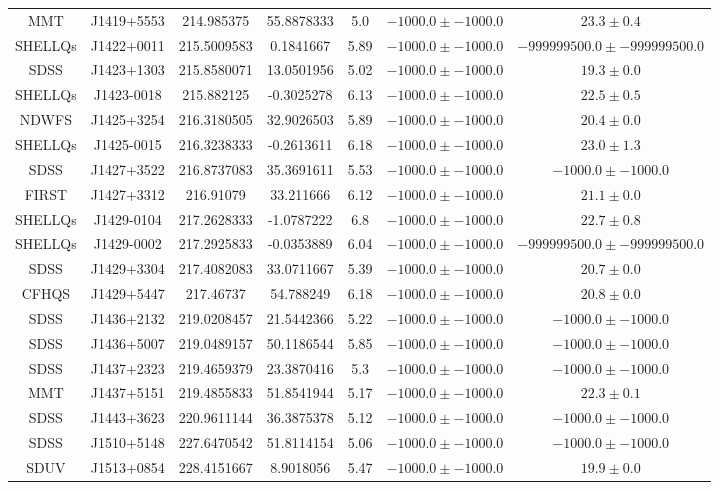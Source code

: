 \begin{table}
\begin{tabular}{ccccccc}
MMT & J1419+5553 & 214.985375 & 55.8878333 & 5.0 & $-1000.0\pm-1000.0$ & $  23.3\pm  0.4$ \\
SHELLQs & J1422+0011 & 215.5009583 & 0.1841667 & 5.89 & $-1000.0\pm-1000.0$ & $-999999500.0\pm-999999500.0$ \\
SDSS & J1423+1303 & 215.8580071 & 13.0501956 & 5.02 & $-1000.0\pm-1000.0$ & $  19.3\pm  0.0$ \\
SHELLQs & J1423-0018 & 215.882125 & -0.3025278 & 6.13 & $-1000.0\pm-1000.0$ & $  22.5\pm  0.5$ \\
NDWFS & J1425+3254 & 216.3180505 & 32.9026503 & 5.89 & $-1000.0\pm-1000.0$ & $  20.4\pm  0.0$ \\
SHELLQs & J1425-0015 & 216.3238333 & -0.2613611 & 6.18 & $-1000.0\pm-1000.0$ & $  23.0\pm  1.3$ \\
SDSS & J1427+3522 & 216.8737083 & 35.3691611 & 5.53 & $-1000.0\pm-1000.0$ & $-1000.0\pm-1000.0$ \\
FIRST & J1427+3312 & 216.91079 & 33.211666 & 6.12 & $-1000.0\pm-1000.0$ & $  21.1\pm  0.0$ \\
SHELLQs & J1429-0104 & 217.2628333 & -1.0787222 & 6.8 & $-1000.0\pm-1000.0$ & $  22.7\pm  0.8$ \\
SHELLQs & J1429-0002 & 217.2925833 & -0.0353889 & 6.04 & $-1000.0\pm-1000.0$ & $-999999500.0\pm-999999500.0$ \\
SDSS & J1429+3304 & 217.4082083 & 33.0711667 & 5.39 & $-1000.0\pm-1000.0$ & $  20.7\pm  0.0$ \\
CFHQS & J1429+5447 & 217.46737 & 54.788249 & 6.18 & $-1000.0\pm-1000.0$ & $  20.8\pm  0.0$ \\
SDSS & J1436+2132 & 219.0208457 & 21.5442366 & 5.22 & $-1000.0\pm-1000.0$ & $-1000.0\pm-1000.0$ \\
SDSS & J1436+5007 & 219.0489157 & 50.1186544 & 5.85 & $-1000.0\pm-1000.0$ & $-1000.0\pm-1000.0$ \\
SDSS & J1437+2323 & 219.4659379 & 23.3870416 & 5.3 & $-1000.0\pm-1000.0$ & $-1000.0\pm-1000.0$ \\
MMT & J1437+5151 & 219.4855833 & 51.8541944 & 5.17 & $-1000.0\pm-1000.0$ & $  22.3\pm  0.1$ \\
SDSS & J1443+3623 & 220.9611144 & 36.3875378 & 5.12 & $-1000.0\pm-1000.0$ & $-1000.0\pm-1000.0$ \\
SDSS & J1510+5148 & 227.6470542 & 51.8114154 & 5.06 & $-1000.0\pm-1000.0$ & $-1000.0\pm-1000.0$ \\
SDUV & J1513+0854 & 228.4151667 & 8.9018056 & 5.47 & $-1000.0\pm-1000.0$ & $  19.9\pm  0.0$ \\

\end{tabular}
\end{table}
